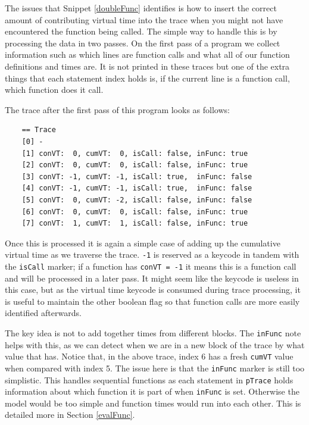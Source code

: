 \documentclass[11pt, abstracton, twoside, titlepage=true]{scrartcl}
\begin{document}
The issues that Snippet \ref{doubleFunc} identifies is how to insert the correct
amount of contributing virtual time into the trace when you might not have 
encountered the function being called. The simple way to handle this is by processing
the data in two passes. On the first pass of a program we collect information
such as which lines are function calls and what all of our function definitions
and times are. It is not printed in these traces but one of the extra things that
each statement index holds is, if the current line is a function call, which function
does it call.

The trace after the first pass of this program looks as follows:
\\
\begin{lstlisting}
    == Trace
    [0] -
    [1] conVT:  0, cumVT:  0, isCall: false, inFunc: true
    [2] conVT:  0, cumVT:  0, isCall: false, inFunc: true
    [3] conVT: -1, cumVT: -1, isCall: true,  inFunc: false
    [4] conVT: -1, cumVT: -1, isCall: true,  inFunc: false
    [5] conVT:  0, cumVT: -2, isCall: false, inFunc: false
    [6] conVT:  0, cumVT:  0, isCall: false, inFunc: true
    [7] conVT:  1, cumVT:  1, isCall: false, inFunc: true
\end{lstlisting}

Once this is processed it is again a simple case of adding up the cumulative virtual
time as we traverse the trace. \texttt{-1} is reserved as a keycode in tandem with
the \texttt{isCall} marker; if a function has \texttt{conVT = -1} it means this
is a function call and will be processed in a later pass. It might seem like the 
keycode is useless in this case, but as the virtual time keycode is consumed during 
trace processing, it is useful to maintain the other boolean flag so that function 
calls are more easily identified afterwards.

The key idea is not to add together times from different blocks. The 
\texttt{inFunc} note helps with this, as we can detect when we are in a new block 
of the trace by what value that has. Notice that, in the above trace, index 6 
has a fresh \texttt{cumVT} value when compared with index 5. The issue here is that 
the \texttt{inFunc} marker is still too simplistic. This handles sequential functions 
as each statement in \texttt{pTrace} holds information about which function it is 
part of when \texttt{inFunc} is set. Otherwise the model would be too simple and 
function times would run into each other. This is detailed more in Section 
\ref{evalFunc}.
\end{document}
